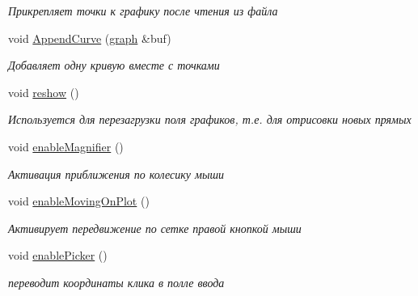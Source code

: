 \begin{DoxyCompactItemize}
\begin{DoxyCompactList}\small\item\em Прикрепляет точки к графику после чтения из файла \end{DoxyCompactList}\item 
void \hyperlink{class_main_window_a28101a1eab9711200fbf177808d037eb}{Append\+Curve} (\hyperlink{classgraph}{graph} \&buf)\hypertarget{class_main_window_a28101a1eab9711200fbf177808d037eb}{}\label{class_main_window_a28101a1eab9711200fbf177808d037eb}

\begin{DoxyCompactList}\small\item\em Добавляет одну кривую вместе с точками \end{DoxyCompactList}\item 
void \hyperlink{class_main_window_a24985964bdf5f59467dcc99749e06bdd}{reshow} ()\hypertarget{class_main_window_a24985964bdf5f59467dcc99749e06bdd}{}\label{class_main_window_a24985964bdf5f59467dcc99749e06bdd}

\begin{DoxyCompactList}\small\item\em Используется для перезагрузки поля графиков, т.\+е. для отрисовки новых прямых \end{DoxyCompactList}\item 
void \hyperlink{class_main_window_afdb82afd72e8643eddf6f4c0266489e8}{enable\+Magnifier} ()\hypertarget{class_main_window_afdb82afd72e8643eddf6f4c0266489e8}{}\label{class_main_window_afdb82afd72e8643eddf6f4c0266489e8}

\begin{DoxyCompactList}\small\item\em Активация приближения по колесику мыши \end{DoxyCompactList}\item 
void \hyperlink{class_main_window_ad04c0aea2156c338a745b02ac456343b}{enable\+Moving\+On\+Plot} ()\hypertarget{class_main_window_ad04c0aea2156c338a745b02ac456343b}{}\label{class_main_window_ad04c0aea2156c338a745b02ac456343b}

\begin{DoxyCompactList}\small\item\em Активирует передвижение по сетке правой кнопкой мыши \end{DoxyCompactList}\item 
void \hyperlink{class_main_window_ac532634c85e6e35dfbd7c5d1c1520e62}{enable\+Picker} ()\hypertarget{class_main_window_ac532634c85e6e35dfbd7c5d1c1520e62}{}\label{class_main_window_ac532634c85e6e35dfbd7c5d1c1520e62}

\begin{DoxyCompactList}\small\item\em переводит координаты клика в полле ввода \end{DoxyCompactList}\end{DoxyCompactItemize}
